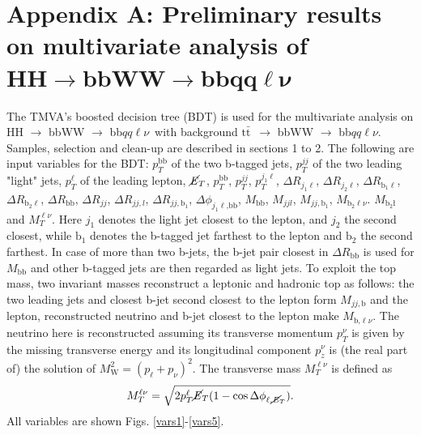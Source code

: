 \documentclass[10pt,a4paper]{article}
\renewcommand{\tt}{$\text{t}\bar{\text{t}}$}
\newcommand{\semi}{$\rightarrow$ bbWW $\rightarrow$ bb$qq\ell\nu$}
\newcommand{\lnu}{$\ell\nu$}
\newcommand{\bb}{\text{bb}}
\newcommand{\MET}{$\cancel{\it{E}}_{T}$}
\begin{document}
\section*{Appendix A: Preliminary results on multivariate analysis of\\ \mbox{$\bm{\text{HH} \rightarrow \text{bbWW} \rightarrow \text{bb} qq\ell\nu}$}}

The TMVA's boosted decision tree (BDT) is used for the multivariate analysis on HH \semi\ with background \tt\ \semi. Samples, selection and clean-up are described in sections 1 to 2. The following are input variables for the BDT:
$p_T^\text{bb}$ of the two b-tagged jets,
$p_T^{jj}$ of the two leading "light" jets,
$p_T^\ell$ of the leading lepton,
\MET,
$p_T^\text{bb}$,
$p_T^{jj}$,
$p_T^{j_1\ell}$,
$\Delta R_{j_1\ell}$,
$\Delta R_{j_2\ell}$,
$\Delta R_{\text{b}_1\ell}$,
$\Delta R_{\text{b}_2\ell}$,
$\Delta R_{\bb}$,
$\Delta R_{jj}$,
$\Delta R_{jj,l}$,
$\Delta R_{jj,\text{b}_1}$,
$\Delta\phi_{j_1\ell\text{,bb}}$,
$M_{\bb}$,
$M_{jjl}$,
$M_{jj,\text{b}_1}$,
$M_{\text{b}_2\text{\lnu}}$.
$M_{\text{b}_2\text{\l}}$ and
$M_T^{\ell\nu}$.
Here $j_1$ denotes the light jet closest to the lepton, and $j_2$ the second closest, while $\text{b}_1$ denotes the b-tagged jet farthest to the lepton and $\text{b}_2$ the second farthest. In case of more than two b-jets, the b-jet pair closest in $\Delta R_{\bb}$ is used for $M_{\bb}$ and other b-tagged jets are then regarded as light jets.
To exploit the top mass, two invariant masses reconstruct a leptonic and hadronic top as follows: the two leading jets and closest b-jet second closest to the lepton form $M_{jj,\text{b}}$ and the lepton, reconstructed neutrino and b-jet closest to the lepton make $M_{\text{b,\lnu}}$. The neutrino here is reconstructed assuming its transverse momentum $p^\nu_T$ is given by the missing transverse energy and its longitudinal component $p^\nu_z$ is (the real part of) the solution of $M_\text{W}^2 = (p_\ell + p_\nu)^2$.
The transverse mass $M_T^{\ell\nu}$ is defined as
\begin{equation} \label{MT}
	M_T^{\ell\nu} = \sqrt{ 2 p_T^\ell \text{\MET} ( 1 - \cos \Delta \phi_{\ell,\text{\MET}} )}.
\end{equation}
All variables are shown Figs. \ref{vars1}-\ref{vars5}.
\end{document}
